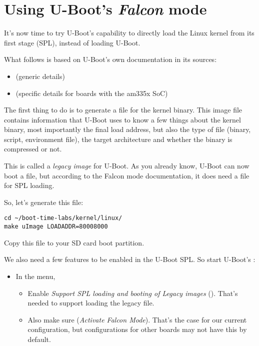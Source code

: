\section{Using U-Boot's {\em Falcon} mode}

It's now time to try U-Boot's capability to directly load the
Linux kernel from its first stage (SPL), instead of loading U-Boot.

What follows is based on U-Boot's own documentation in its sources:
\begin{itemize}
\item {} (generic details)
\item {} (specific details for boards with
      the am335x SoC)
\end{itemize}

The first thing to do is to generate a  file for the kernel
binary. This image file contains information that U-Boot uses to know a
few things about the kernel binary, most importantly the final load
address, but also the type of file (binary, script, environment file),
the target architecture and whether the binary is compressed or not.

This is called a {\em legacy image} for U-Boot. As you already know,
U-Boot can now boot a  file, but according to the Falcon
mode documentation, it does need a  file for SPL loading.

So, let's generate this file:
\begin{verbatim}
cd ~/boot-time-labs/kernel/linux/
make uImage LOADADDR=80008000
\end{verbatim}

Copy this  file to your SD card boot partition.

We also need a few features to be enabled in the U-Boot SPL. So start
U-Boot's :
\begin{itemize}
\item In the  menu,
      \begin{itemize}
      \item Enable {\em Support SPL loading and booting of Legacy images}
            ().
            That's needed to support loading the legacy  file.
      \item Also make sure 
            ({\em Activate Falcon Mode}).
            That's the case for our current configuration, but configurations
            for other boards may not have this by default.
      \end{itemize}
\end{itemize}

